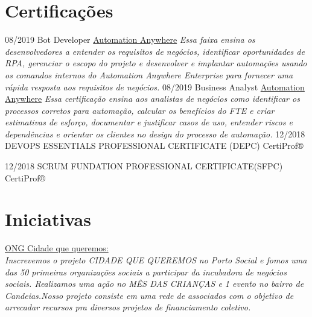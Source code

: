 \documentclass[]{friggeri-cv}
\begin{document}
\section{Certificações}
\begin{entrylist}
  \entry
    {08/2019}
    {Bot Developer}
    {\href{https://certificates.automationanywhere.com/d4efdc40-8468-4d69-8508-b6d0be2068c4}{Automation Anywhere}}
    {\emph{Essa faixa ensina os desenvolvedores a entender os requisitos de negócios, identificar oportunidades de RPA, gerenciar o escopo do projeto e desenvolver e implantar automações usando os comandos internos do Automation Anywhere Enterprise para fornecer uma rápida resposta aos requisitos de negócios.}}
    \entry
    {08/2019}
    {Business Analyst}
    {\href{https://certificates.automationanywhere.com/60bdab56-89aa-4043-aee6-20ad65fd493a}{Automation Anywhere}}
    {\emph{Essa certificação ensina aos analistas de negócios como identificar os processos corretos para automação, calcular os benefícios do FTE e criar estimativas de esforço, documentar e justificar casos de uso, entender riscos e dependências e orientar os clientes no design do processo de automação.}}
    \entry
    {12/2018}
    {DEVOPS ESSENTIALS PROFESSIONAL CERTIFICATE (DEPC)}
    {CertiProf®}
    
    \entry
    {12/2018}
    {SCRUM FUNDATION PROFESSIONAL CERTIFICATE(SFPC)}
    {CertiProf®}
    
\end{entrylist}

\section{Iniciativas}
\href{https://www.portosocial.com.br/incubados/}{ONG Cidade que queremos:}\\
\emph{Inscrevemos o projeto CIDADE QUE QUEREMOS no Porto Social e fomos uma das 50 primeiras organizações sociais a participar da incubadora de negócios sociais. Realizamos uma ação no MÊS DAS CRIANÇAS e 1 evento no bairro de Candeias.Nosso projeto consiste em uma rede de associados com o objetivo de arrecadar recursos pra diversos projetos de financiamento coletivo.}
\end{document}
